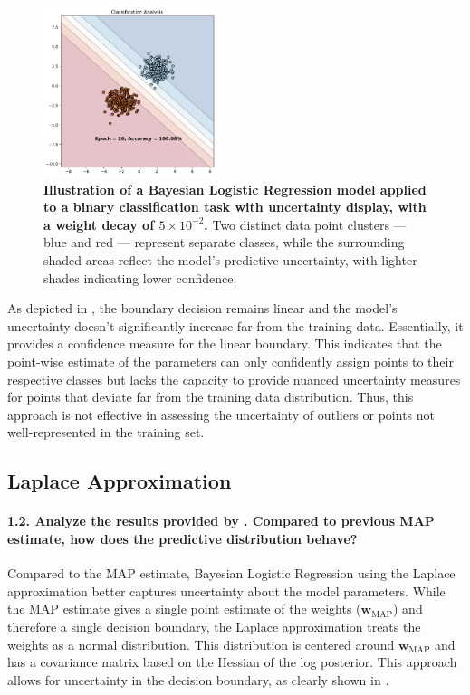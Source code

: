 \begin{figure}[H]
    \centering
    \includegraphics[width=0.45\textwidth]{logreg_map.pdf}
    \caption{\textbf{Illustration of a Bayesian Logistic Regression model applied to a binary classification task with uncertainty display, with a weight decay of $5 \times 10^{-2}$.} Two distinct data point clusters — blue and red — represent separate classes, while the surrounding shaded areas reflect the model's predictive uncertainty, with lighter shades indicating lower confidence.}
    \label{fig:logreg_map}
\end{figure}

As depicted in , the boundary decision remains linear and the model's uncertainty doesn't significantly increase far from the training data. Essentially, it provides a confidence measure for the linear boundary. This indicates that the point-wise estimate of the parameters can only confidently assign points to their respective classes but lacks the capacity to provide nuanced uncertainty measures for points that deviate far from the training data distribution. Thus, this approach is not effective in assessing the uncertainty of outliers or points not well-represented in the training set.

\subsection{Laplace Approximation}
\paragraph{1.2. Analyze the results provided by . Compared to previous MAP estimate, how does the predictive distribution behave?}

Compared to the MAP estimate, Bayesian Logistic Regression using the Laplace approximation better captures uncertainty about the model parameters. While the MAP estimate gives a single point estimate of the weights ($\mathbf{w}_{\textrm{MAP}}$) and therefore a single decision boundary, the Laplace approximation treats the weights as a normal distribution. This distribution is centered around $\mathbf{w}_{\textrm{MAP}}$ and has a covariance matrix based on the Hessian of the log posterior. This approach allows for uncertainty in the decision boundary, as clearly shown in .

